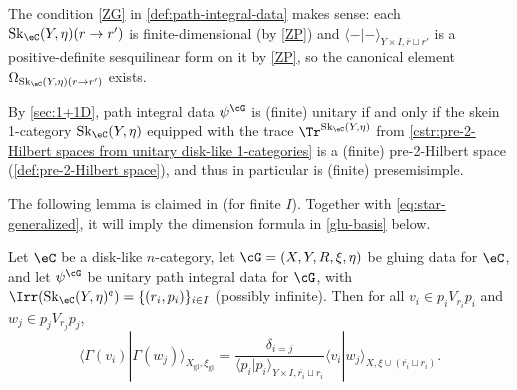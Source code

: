 \documentclass[12pt,reqno]{amsart}
\newcommand{\glu}{\mathrm{gl}}
\newcommand{\Sk}{\mathrm{Sk}}
\newcommand{\C}{\eC}
\newcommand{\fcj}[1]{\overline{#1}}
\newcommand{\bkt}[2]{\langle #1|#2 \rangle}
\newcommand{\cent}{\textup{\textcent}}
\renewcommand{\amalg}{\sqcup}
\begin{document}
The condition \ref{ZG} in \cref{def:path-integral-data} makes sense: each $\Sk_\C(Y,\eta)(r\to r')$ is finite-dimensional (by \ref{ZP}) and $\bkt--_{Y\times I,\fcj{r}\amalg r'}$ is a positive-definite sesquilinear form on it by \ref{ZP}, so the canonical element $\Omega_{\Sk_\C(Y,\eta)(r\to r')}$ exists.

\begin{remark}
\label{rmkm}
    By \cref{sec:1+1D}, path integral data $\psi^\cG$ is (finite) unitary if and only if the skein 1-category $\Sk_\C(Y,\eta)$ equipped with the trace $\Tr^{\Sk_\C(Y,\eta)}$ from \cref{cstr:pre-2-Hilbert spaces from unitary disk-like 1-categories} is a (finite) pre-2-Hilbert space (\cref{def:pre-2-Hilbert space}), and thus in particular is (finite) presemisimple.
\end{remark}

The following lemma is claimed in \cite[6.2.5]{W06} (for finite $I$). Together with \eqref{eq:star-generalized}, it will imply the dimension formula in \cref{glu-basis} below. 

\begin{lemma}[{\cite[6.2.5]{W06}}]
\label{glu-ip}
Let $\C$ be a disk-like $n$-category, let $\cG=(X,Y,R,\xi,\eta)$ be gluing data for $\C$, and let $\psi^\cG$ be unitary path integral data for $\cG$, with $\Irr(\Sk_\C(Y,\eta)^\cent)=\{(r_i,p_i)\}_{i\in I}$ (possibly infinite). Then for all $v_i\in p_iV_{r_i}p_i$ and $w_j\in p_jV_{r_j}p_j$, 
\begin{equation}
\label{ipeqn}
  \bkt{\Gamma(v_i)}{\Gamma(w_j)}_{X_{\glu},\xi_{\glu}}
  =
  \frac{\delta_{i=j}}{\bkt{p_i}{p_i}_{Y\times I,\fcj{r_i}\amalg r_i}}
  \bkt{v_i}{w_j}_{X,\xi\cup(\fcj{r_i}\amalg r_i)}.
\end{equation}
\end{lemma}
\end{document}
